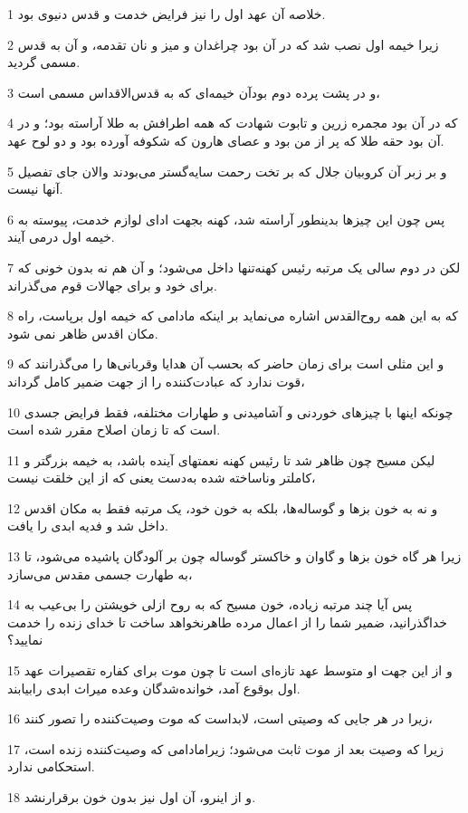 \par 1 خلاصه آن عهد اول را نیز فرایض خدمت و قدس دنیوی بود.
\par 2 زیرا خیمه اول نصب شد که در آن بود چراغدان و میز و نان تقدمه، و آن به قدس مسمی گردید.
\par 3 و در پشت پرده دوم بودآن خیمه‌ای که به قدس‌الاقداس مسمی است،
\par 4 که در آن بود مجمره زرین و تابوت شهادت که همه اطرافش به طلا آراسته بود؛ و در آن بود حقه طلا که پر از من بود و عصای هارون که شکوفه آورده بود و دو لوح عهد.
\par 5 و بر زبر آن کروبیان جلال که بر تخت رحمت سایه‌گستر می‌بودند والان جای تفصیل آنها نیست.
\par 6 پس چون این چیزها بدینطور آراسته شد، کهنه بجهت ادای لوازم خدمت، پیوسته به خیمه اول درمی آیند.
\par 7 لکن در دوم سالی یک مرتبه رئیس کهنه‌تنها داخل می‌شود؛ و آن هم نه بدون خونی که برای خود و برای جهالات قوم می‌گذراند.
\par 8 که به این همه روح‌القدس اشاره می‌نماید بر اینکه مادامی که خیمه اول برپاست، راه مکان اقدس ظاهر نمی شود.
\par 9 و این مثلی است برای زمان حاضر که بحسب آن هدایا وقربانی‌ها را می‌گذرانند که قوت ندارد که عبادت‌کننده را از جهت ضمیر کامل گرداند،
\par 10 چونکه اینها با چیزهای خوردنی و آشامیدنی و طهارات مختلفه، فقط فرایض جسدی است که تا زمان اصلاح مقرر شده است.
\par 11 لیکن مسیح چون ظاهر شد تا رئیس کهنه نعمتهای آینده باشد، به خیمه بزرگتر و کاملتر وناساخته شده به‌دست یعنی که از این خلقت نیست،
\par 12 و نه به خون بزها و گوساله‌ها، بلکه به خون خود، یک مرتبه فقط به مکان اقدس داخل شد و فدیه ابدی را یافت.
\par 13 زیرا هر گاه خون بزها و گاوان و خاکستر گوساله چون بر آلودگان پاشیده می‌شود، تا به طهارت جسمی مقدس می‌سازد،
\par 14 پس آیا چند مرتبه زیاده، خون مسیح که به روح ازلی خویشتن را بی‌عیب به خداگذرانید، ضمیر شما را از اعمال مرده طاهرنخواهد ساخت تا خدای زنده را خدمت نمایید؟
\par 15 و از این جهت او متوسط عهد تازه‌ای است تا چون موت برای کفاره تقصیرات عهد اول بوقوع آمد، خوانده‌شدگان وعده میراث ابدی رابیابند.
\par 16 زیرا در هر جایی که وصیتی است، لابداست که موت وصیت‌کننده را تصور کنند،
\par 17 زیرا که وصیت بعد از موت ثابت می‌شود؛ زیرامادامی که وصیت‌کننده زنده است، استحکامی ندارد.
\par 18 و از اینرو، آن اول نیز بدون خون برقرارنشد.

